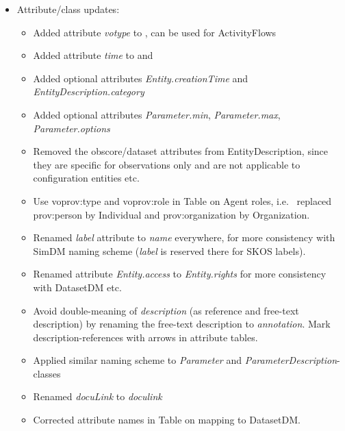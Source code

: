 \begin{itemize}
\item Attribute/class updates:
\begin{itemize}
    \item Added attribute \emph{votype} to , can be used for ActivityFlows
    \item Added attribute \emph{time} to  and 
    \item Added optional attributes \emph{Entity.creationTime} and \emph{EntityDescription.category}
    \item Added optional attributes \emph{Parameter.min},  \emph{Parameter.max},  \emph{Parameter.options}
    \item Removed the obscore/dataset attributes from EntityDescription, since they are specific for observations only and are not applicable to configuration entities etc.
    \item Use voprov:type and voprov:role in Table on Agent roles, i.e.~ replaced prov:person by Individual and prov:organization by Organization.
    \item Renamed \emph{label} attribute to \emph{name} everywhere, for more consistency with SimDM naming scheme (\emph{label} is reserved there for SKOS labels).
    \item Renamed attribute \emph{Entity.access} to \emph{Entity.rights} for more consistency with DatasetDM etc.
    \item Avoid double-meaning of \emph{description} (as reference and free-text description) by renaming the free-text description to \emph{annotation}. Mark description-references with arrows in attribute tables.
    \item Applied similar naming scheme to \emph{Parameter} and \emph{ParameterDescription}-classes
    \item Renamed \emph{docuLink} to \emph{doculink}
    \item Corrected attribute names in Table on mapping to DatasetDM.
\end{itemize}
\end{itemize}
